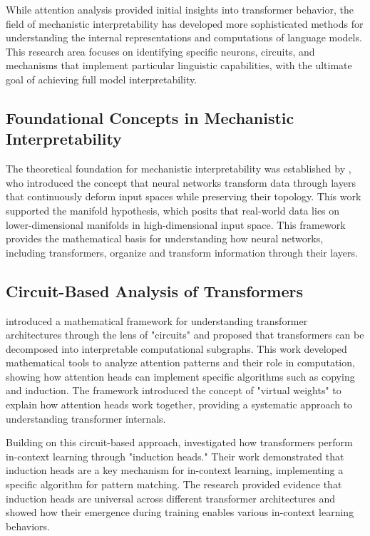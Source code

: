 While attention analysis provided initial insights into transformer behavior, the field of mechanistic interpretability has developed more sophisticated methods for understanding the internal representations and computations of language models. This research area focuses on identifying specific neurons, circuits, and mechanisms that implement particular linguistic capabilities, with the ultimate goal of achieving full model interpretability.

\subsection{Foundational Concepts in Mechanistic Interpretability}

The theoretical foundation for mechanistic interpretability was established by \citet{olah2014manifolds}, who introduced the concept that neural networks transform data through layers that continuously deform input spaces while preserving their topology. This work supported the manifold hypothesis, which posits that real-world data lies on lower-dimensional manifolds in high-dimensional input space. This framework provides the mathematical basis for understanding how neural networks, including transformers, organize and transform information through their layers.

\subsection{Circuit-Based Analysis of Transformers}

\citet{elhage2021mathematical} introduced a mathematical framework for understanding transformer architectures through the lens of "circuits" and proposed that transformers can be decomposed into interpretable computational subgraphs. This work developed mathematical tools to analyze attention patterns and their role in computation, showing how attention heads can implement specific algorithms such as copying and induction. The framework introduced the concept of "virtual weights" to explain how attention heads work together, providing a systematic approach to understanding transformer internals.

Building on this circuit-based approach, \citet{olsson2022inductionheads} investigated how transformers perform in-context learning through "induction heads." Their work demonstrated that induction heads are a key mechanism for in-context learning, implementing a specific algorithm for pattern matching. The research provided evidence that induction heads are universal across different transformer architectures and showed how their emergence during training enables various in-context learning behaviors.

